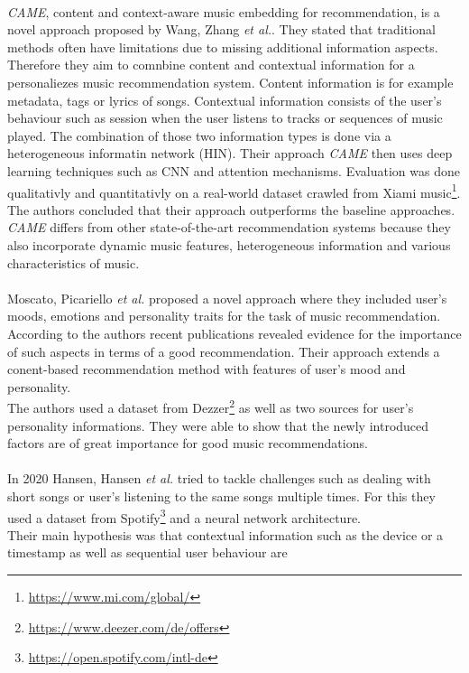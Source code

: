 \documentclass[runningheads,a4paper]{llncs}
\begin{document}
\\
\textit{CAME}, content and context-aware music embedding for recommendation, is a novel approach proposed by Wang, Zhang \textit{et al.}.
They stated that traditional methods often have limitations due to missing additional information aspects. 
Therefore they aim to comnbine content and contextual information for a personaliezes music recommendation system. 
Content information is for example metadata, tags or lyrics of songs. 
Contextual information consists of the user's behaviour such as session when the user listens to tracks or sequences of music played. 
The combination of those two information types is done via a heterogeneous informatin network (HIN).
Their approach \textit{CAME} then uses deep learning techniques such as CNN and attention mechanisms.
Evaluation was done qualitativly and quantitativly on a real-world dataset crawled from Xiami music\footnote{\url{https://www.mi.com/global/}}. 
The authors concluded that their approach outperforms the baseline approaches.
\textit{CAME} differs from other state-of-the-art recommendation systems because they 
also incorporate dynamic music features, heterogeneous information and various characteristics of music.
\cite{wang2020came}\\
\\
Moscato, Picariello \textit{et al.} proposed a novel approach where they included user's moods, emotions and personality traits for the 
task of music recommendation. According to the authors recent publications revealed evidence for the importance of such aspects in terms of 
a good recommendation.
Their approach extends a conent-based recommendation method with features of user's mood and personality.\\
The authors used a dataset from Dezzer\footnote{\url{https://www.deezer.com/de/offers}} as well as two sources for 
user's personality informations. 
They were able to show that the newly introduced factors are of great importance for good music recommendations. \cite{moscato2020emotional}\\
\\
In 2020 Hansen, Hansen \textit{et al.} tried to tackle challenges such as dealing with short songs or user's listening to the same songs multiple times.
For this they used a dataset from Spotify\footnote{\url{https://open.spotify.com/intl-de}} and a neural network architecture. \\
Their main hypothesis was that contextual information such as the device or a timestamp as well as sequential user behaviour are 
\end{document}
